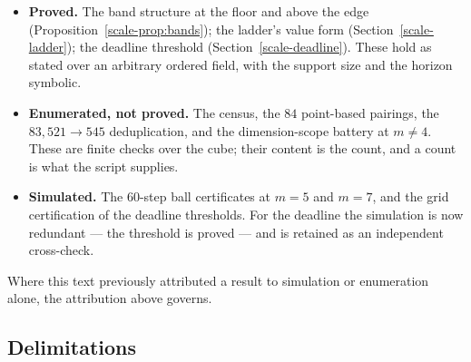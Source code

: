 \documentclass[10pt,twocolumn]{article}
\theoremstyle{plain}
\theoremstyle{definition}
\theoremstyle{remark}
\begin{document}
\begin{itemize}
\item \textbf{Proved.} The band structure at the floor and above the
edge (Proposition~\ref{scale-prop:bands}); the ladder's value form
(Section~\ref{scale-ladder}); the deadline threshold
(Section~\ref{scale-deadline}). These hold as stated over an arbitrary
ordered field, with the support size and the horizon symbolic.

\item \textbf{Enumerated, not proved.} The census, the \(84\)
point-based pairings, the \(83{,}521 \to 545\) deduplication, and the
dimension-scope battery at \(m \ne 4\). These are finite checks over
the cube; their content is the count, and a count is what the script
supplies.

\item \textbf{Simulated.} The \(60\)-step ball certificates at
\(m = 5\) and \(m = 7\), and the grid certification of the deadline
thresholds. For the deadline the simulation is now redundant --- the
threshold is proved --- and is retained as an independent cross-check.
\end{itemize}

\noindent Where this text previously attributed a result to simulation
or enumeration alone, the attribution above governs.

\subsection{Delimitations}\label{scale-scope}
\end{document}
